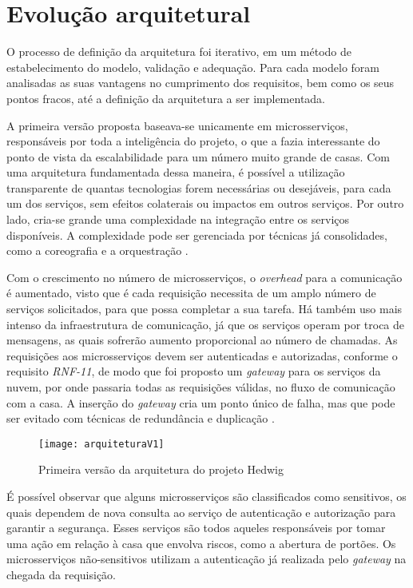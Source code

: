 \section{Evolução arquitetural}
O processo de definição da arquitetura foi iterativo, em um método de estabelecimento do modelo, validação e adequação. Para cada modelo foram analisadas as suas vantagens no cumprimento dos requisitos, bem como os seus pontos fracos, até a definição da arquitetura a ser implementada.

A primeira versão proposta baseava-se unicamente em microsserviços, responsáveis por toda a inteligência do projeto, o que a fazia interessante do ponto de vista da escalabilidade para um número muito grande de casas. Com uma arquitetura fundamentada dessa maneira, é possível a utilização transparente de quantas tecnologias forem necessárias ou desejáveis, para cada um dos serviços, sem efeitos colaterais ou impactos em outros serviços. Por outro lado, cria-se grande uma complexidade na integração entre os serviços disponíveis. A complexidade pode ser gerenciada por técnicas já consolidades, como a coreografia e a orquestração \cite{lewis}.

Com o crescimento no número de microsserviços, o \emph{overhead} para a comunicação é aumentado, visto que é cada requisição necessita de um amplo número de serviços solicitados, para que possa completar a sua tarefa. Há também uso mais intenso da infraestrutura de comunicação, já que os serviços operam por troca de mensagens, as quais sofrerão aumento proporcional ao número de chamadas. As requisições aos microsserviços devem ser autenticadas e autorizadas, conforme o requisito \emph{RNF-11}, de modo que foi proposto um \emph{gateway} para os serviços da nuvem, por onde passaria todas as requisições válidas, no fluxo de comunicação com a casa. A inserção do \emph{gateway} cria um ponto único de falha, mas que pode ser evitado com técnicas de redundância e duplicação \cite{oracleSPOF}. 

\begin{figure}[H]
	\centering
	\caption{Primeira versão da arquitetura do projeto Hedwig}
  \texttt{[image: arquiteturaV1]}
\label{fig:arquiteturaV1}
\end{figure}

É possível observar que alguns microsserviços são classificados como sensitivos, os quais dependem de nova consulta ao serviço de autenticação e autorização para garantir a segurança. Esses serviços são todos aqueles responsáveis por tomar uma ação em relação à casa que envolva riscos, como a abertura de portões. Os microsserviços não-sensitivos utilizam a autenticação já realizada pelo \textit{gateway} na chegada da requisição.

